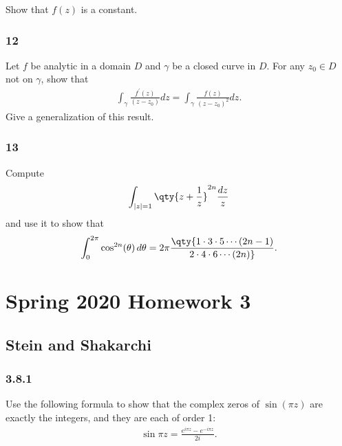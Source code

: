 Show that \(f(z)\) is a constant.

\hypertarget{section-58}{%
\subsubsection{12}\label{section-58}}

Let \(f\) be analytic in a domain \(D\) and \(\gamma\) be a closed curve
in \(D\). For any \(z_0\in D\) not on \(\gamma\), show that
\begin{align*}
\int_{\gamma} \frac{f^{\prime}(z)}{\left(z-z_{0}\right)} d z=\int_{\gamma} \frac{f(z)}{\left(z-z_{0}\right)^{2}} d z
.\end{align*}
Give a generalization of this result.

\hypertarget{section-59}{%
\subsubsection{13}\label{section-59}}

Compute
\begin{align*}
\int_{{\left\lvert {z} \right\rvert} = 1} \qty{z + {1\over z}}^{2n} {dz \over z}
\end{align*}
and use it to show that
\begin{align*}
\int_0^{2\pi} \cos^{2n}(\theta) \, d\theta = 2\pi \qty{1\cdot 3 \cdot 5 \cdots (2n-1) \over 2 \cdot 4 \cdot 6 \cdots (2n)}
.\end{align*}

\hypertarget{spring-2020-homework-3}{%
\section{Spring 2020 Homework 3}\label{spring-2020-homework-3}}

\hypertarget{stein-and-shakarchi-1}{%
\subsection{Stein and Shakarchi}\label{stein-and-shakarchi-1}}

\hypertarget{section-60}{%
\subsubsection{3.8.1}\label{section-60}}

Use the following formula to show that the complex zeros of
\(\sin(\pi z)\) are exactly the integers, and they are each of order 1:
\begin{align*}
\sin \pi z=\frac{e^{i \pi z}-e^{-i \pi z}}{2 i}
.\end{align*}

